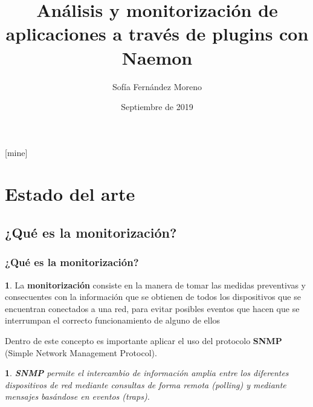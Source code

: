 \documentclass{beamer}
\title[]{Análisis y monitorización de aplicaciones a través de plugins con Naemon} %
\author{Sofía Fernández Moreno} %
\institute[UGR] %
{
  Universidad de Granada \\ %
}
\date{Septiembre de 2019} %
\theoremstyle{plain}
\theoremstyle{definition}
\newtheorem{defn}[thm]{}
\theoremstyle{plain}
\newtheorem{prop}[thm]{}
\theoremstyle{definition}
\theoremstyle{remark}
\theoremstyle{definition}
\begin{document}
\theoremstyle{definition}
[mine]

\frame{\titlepage}




\section{Estado del arte} %

\subsection{¿Qué es la monitorización?}
\begin{frame}
	\frametitle{¿Qué es la monitorización?}
	\begin{defn}
		La \textbf{monitorización} consiste en la manera de tomar las medidas preventivas y
		consecuentes con la información que se obtienen de todos los dispositivos
		que se encuentran conectados a una red, para evitar posibles eventos que
		hacen que se interrumpan el correcto funcionamiento de alguno de ellos
	\end{defn}
Dentro de este concepto es importante aplicar el uso del protocolo \textbf{SNMP} (Simple Network
Management Protocol).
\begin{prop}
	\textbf{SNMP} permite el intercambio de información amplia entre los diferentes dispositivos de red mediante consultas de forma remota (polling) y mediante mensajes basándose en eventos (traps).
\end{prop}

	
\end{frame}
\end{document}
